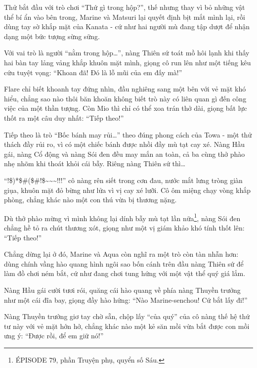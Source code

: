 \documentclass[../main.tex]{subfiles}
\begin{document}
\il

Thử bắt đầu với trò chơi ``Thứ gì trong hộp?'', thế nhưng thay vì bỏ những vật thể bí ẩn vào bên trong, Marine và Matsuri lại quyết định bịt mắt mình lại, rồi dùng tay sờ khắp mặt của Kanata - cứ như hai người mù đang tập dượt để nhận dạng một bức tượng sừng sững.


Với vai trò là người ``nằm trong hộp\dots'', nàng Thiên sứ toát mồ hôi lạnh khi thấy hai bàn tay lảng vảng khắp khuôn mặt mình, giọng cô run lên như một tiếng kêu cứu tuyệt vọng: ``Khoan đã! Đó là lỗ mũi của em đấy mà!''

Flare chỉ biết khoanh tay đứng nhìn, đầu nghiêng sang một bên với vẻ mặt khó hiểu, chẳng sao nào thôi băn khoăn không biết trò này có liên quan gì đến công việc của một thần tượng. Còn Mio thì chỉ có thể xoa trán thở dài, giọng bất lực thốt ra một câu duy nhất: ``Tiếp theo!''

\il

Tiếp theo là trò ``Bốc bánh may rủi\dots'' theo đúng phong cách của Towa - một thử thách đầy rủi ro, vì có một chiếc bánh được nhồi đầy mù tạt cay xé. Nàng Hầu gái, nàng Cổ động và nàng Sói đen đều may mắn an toàn, cả ba cùng thở phào nhẹ nhõm khi thoát khỏi cái bẫy. Riêng nàng Thiên sứ thì\dots

``!\$)*\$\#(\$\#!\$\~{}\~{}\~{}!!!'' cô nàng rên siết trong cơn đau, nước mắt lưng tròng giàn giụa, khuôn mặt đỏ bừng như lửa vì vị cay xé lưỡi. Cô ôm miệng chạy vòng khắp phòng, chẳng khác nào một con thú vừa bị thương nặng.


Dù thở phào mừng vì mình không lại dính bẫy mù tạt lần nữa\footnote{{\flaregothic ÉPISODE 79}, phần {\abv Truyện phụ}, quyển số Sáu.}, nàng Sói đen chẳng hề tỏ ra chút thương xót, giọng như một vị giám khảo khó tính thốt lên: ``Tiếp theo!''

\il

Chẳng dừng lại ở đó, Marine và Aqua còn nghĩ ra một trò còn tàn nhẫn hơn: dùng chính vầng hào quang hình ngôi sao bốn cánh trên đầu nàng Thiên sứ để làm đồ chơi ném bắt, cứ như đang chơi tung hứng với một vật thể quý giá lắm.


Nàng Hầu gái cười tươi rói, quăng cái hào quang về phía nàng Thuyền trưởng như một cái đĩa bay, giọng đầy hào hứng: ``Nào Marine-senchou! Cứ bắt lấy đi!''

Nàng Thuyền trưởng giơ tay chờ sẵn, chộp lấy ``của quý'' của cô nàng thế hệ thứ tư này với vẻ mặt hớn hở, chẳng khác nào một kẻ săn mồi vừa bắt được con mồi ưng ý: ``Được rồi, để em giữ nó!''
\end{document}
